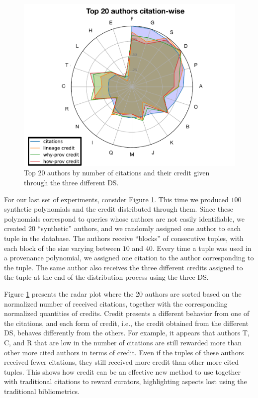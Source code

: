 
\begin{figure}[]
\centering
  \includegraphics[width=.8\textwidth]{figures/radar_top_synthetic_enhanced}
  \caption{Top 20 authors by number of citations and their credit given through the three different DS.}
  \label{figure:synthetic_authors}
\end{figure}

For our last set of experiments, consider Figure \ref{figure:synthetic_authors}.
This time we produced $100$ synthetic polynomials and the credit distributed through them. Since these polynomials correspond to queries whose authors are not easily identifiable, we created $20$ ``synthetic'' authors, and we randomly assigned one author to each tuple in the database. The authors receive ``blocks'' of consecutive tuples, with each block of the size varying between $10$ and $40$. 
Every time a tuple was used in a provenance polynomial, we assigned one citation to the author corresponding to the tuple.  The same author also receives the three different credits assigned to the tuple at the end of the distribution process using the three DS.

Figure \ref{figure:synthetic_authors} presents the radar plot where the 20 authors are sorted based on the normalized number of received citations, together with the corresponding normalized quantities of credits.
Credit presents a different behavior from one of the citations, and each form of credit, i.e., the credit obtained from the different DS, behaves differently from the others.
For example, it appears that authors T, C, and R that are low in the number of citations are still rewarded more than other more cited authors in terms of credit.
Even if the tuples of these authors received fewer citations, they still received more credit than other more cited tuples. This shows how credit can be an effective new method to use together with traditional citations to reward curators, highlighting aspects lost using the traditional bibliometrics.

